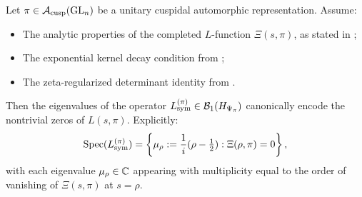 \begin{theorem}
\label{thm:zero_encoding_general}
Let \( \pi \in \mathcal{A}_{\mathrm{cusp}}(\mathrm{GL}_n) \) be a unitary cuspidal automorphic representation. Assume:
\begin{itemize}
  \item The analytic properties of the completed \( L \)-function \( \Xi(s, \pi) \), as stated in ;
  \item The exponential kernel decay condition from ;
  \item The zeta-regularized determinant identity from .
\end{itemize}

Then the eigenvalues of the operator \( L_{\mathrm{sym}}^{(\pi)} \in \mathcal{B}_1(H_{\Psi_{\pi}}) \) canonically encode the nontrivial zeros of \( L(s, \pi) \). Explicitly:
\[
\operatorname{Spec}(L_{\mathrm{sym}}^{(\pi)}) = \left\{ \mu_\rho := \frac{1}{i}(\rho - \tfrac{1}{2}) : \Xi(\rho, \pi) = 0 \right\},
\]
with each eigenvalue \( \mu_\rho \in \mathbb{C} \) appearing with multiplicity equal to the order of vanishing of \( \Xi(s, \pi) \) at \( s = \rho \).
\end{theorem}
